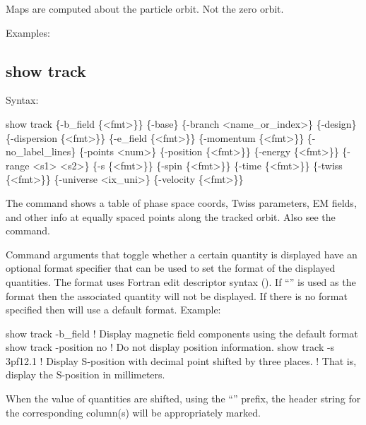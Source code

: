 {{{{{{{{{Maps are computed about the particle orbit. Not the zero orbit.

Examples:


\subsection{show track}
\label{s:show.track}

Syntax:
\begin{example}
  show track \{-b_field \{<fmt>\}\} \{-base\} \{-branch <name_or_index>\} \{-design\} 
      \{-dispersion \{<fmt>\}\} \{-e_field \{<fmt>\}\} \{-momentum \{<fmt>\}\} \{-no_label_lines\} 
      \{-points <num>\} \{-position \{<fmt>\}\} \{-energy \{<fmt>\}\} \{-range <s1> <s2>\}
      \{-s \{<fmt>\}\} \{-spin \{<fmt>\}\} \{-time \{<fmt>\}\} \{-twiss \{<fmt>\}\}
      \{-universe <ix_uni>\} \{-velocity \{<fmt>\}\}
\end{example}

The  command shows a table of phase space coords, Twiss parameters, EM fields, and
other info at equally spaced points along the tracked orbit. Also see the 
command.

Command arguments that toggle whether a certain quantity is displayed have an optional 
format specifier that can be used to set the format of the displayed quantities. The format uses
Fortran edit descriptor syntax (). If ``'' is used as the format then
the associated quantity will not be displayed. If there is no format specified then \tao will use
a default format. Example:
\begin{example}
  show track -b_field      ! Display magnetic field components using the default format
  show track -position no  ! Do not display position information.
  show track -s 3pf12.1    ! Display S-position with decimal point shifted by three places.
                           !   That is, display the S-position in millimeters.
\end{example}
When the value of quantities are shifted, using the ``'' prefix, the header string for the
corresponding column(s) will be appropriately marked.

}}}}}}}}}
